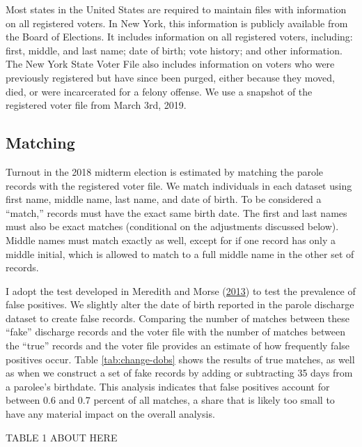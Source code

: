 \documentclass[
  12pt,
]{article}
\begin{document}
Most states in the United States are required to maintain files with information on all registered voters. In New York, this information is publicly available from the Board of Elections. It includes information on all registered voters, including: first, middle, and last name; date of birth; vote history; and other information. The New York State Voter File also includes information on voters who were previously registered but have since been purged, either because they moved, died, or were incarcerated for a felony offense. We use a snapshot of the registered voter file from March 3rd, 2019.

\hypertarget{matching}{%
\subsection*{Matching}\label{matching}}

Turnout in the 2018 midterm election is estimated by matching the parole records with the registered voter file. We match individuals in each dataset using first name, middle name, last name, and date of birth. To be considered a ``match,'' records must have the exact same birth date. The first and last names must also be exact matches (conditional on the adjustments discussed below). Middle names must match exactly as well, except for if one record has only a middle initial, which is allowed to match to a full middle name in the other set of records.

I adopt the test developed in Meredith and Morse (\protect\hyperlink{ref-Meredith2013}{2013}) to test the prevalence of false positives. We slightly alter the date of birth reported in the parole discharge dataset to create false records. Comparing the number of matches between these ``fake'' discharge records and the voter file with the number of matches between the ``true'' records and the voter file provides an estimate of how frequently false positives occur. Table \ref{tab:change-dobs} shows the results of true matches, as well as when we construct a set of fake records by adding or subtracting 35 days from a parolee's birthdate. This analysis indicates that false positives account for between 0.6 and 0.7 percent of all matches, a share that is likely too small to have any material impact on the overall analysis.

TABLE 1 ABOUT HERE
\end{document}
